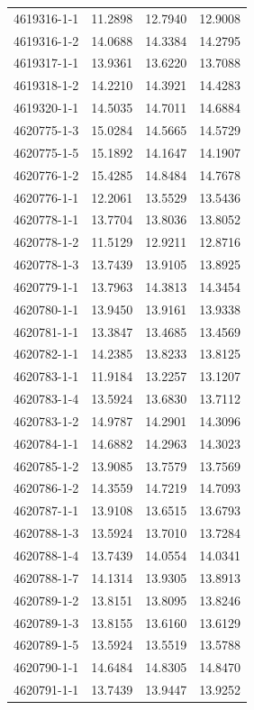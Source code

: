 \begin{longtable}{lrrr}
4619316-1-1 & 11.2898 & 12.7940 & 12.9008 \\
4619316-1-2 & 14.0688 & 14.3384 & 14.2795 \\
4619317-1-1 & 13.9361 & 13.6220 & 13.7088 \\
4619318-1-2 & 14.2210 & 14.3921 & 14.4283 \\
4619320-1-1 & 14.5035 & 14.7011 & 14.6884 \\
4620775-1-3 & 15.0284 & 14.5665 & 14.5729 \\
4620775-1-5 & 15.1892 & 14.1647 & 14.1907 \\
4620776-1-2 & 15.4285 & 14.8484 & 14.7678 \\
4620776-1-1 & 12.2061 & 13.5529 & 13.5436 \\
4620778-1-1 & 13.7704 & 13.8036 & 13.8052 \\
4620778-1-2 & 11.5129 & 12.9211 & 12.8716 \\
4620778-1-3 & 13.7439 & 13.9105 & 13.8925 \\
4620779-1-1 & 13.7963 & 14.3813 & 14.3454 \\
4620780-1-1 & 13.9450 & 13.9161 & 13.9338 \\
4620781-1-1 & 13.3847 & 13.4685 & 13.4569 \\
4620782-1-1 & 14.2385 & 13.8233 & 13.8125 \\
4620783-1-1 & 11.9184 & 13.2257 & 13.1207 \\
4620783-1-4 & 13.5924 & 13.6830 & 13.7112 \\
4620783-1-2 & 14.9787 & 14.2901 & 14.3096 \\
4620784-1-1 & 14.6882 & 14.2963 & 14.3023 \\
4620785-1-2 & 13.9085 & 13.7579 & 13.7569 \\
4620786-1-2 & 14.3559 & 14.7219 & 14.7093 \\
4620787-1-1 & 13.9108 & 13.6515 & 13.6793 \\
4620788-1-3 & 13.5924 & 13.7010 & 13.7284 \\
4620788-1-4 & 13.7439 & 14.0554 & 14.0341 \\
4620788-1-7 & 14.1314 & 13.9305 & 13.8913 \\
4620789-1-2 & 13.8151 & 13.8095 & 13.8246 \\
4620789-1-3 & 13.8155 & 13.6160 & 13.6129 \\
4620789-1-5 & 13.5924 & 13.5519 & 13.5788 \\
4620790-1-1 & 14.6484 & 14.8305 & 14.8470 \\
4620791-1-1 & 13.7439 & 13.9447 & 13.9252 \\

\end{longtable}

